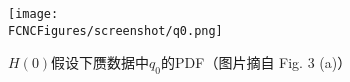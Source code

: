 \begin{figure}[H]
\centering
\texttt{[image: \\FCNCFigures/screenshot/q0.png]}
\caption{$H(0)$假设下赝数据中$q_0$的PDF（图片摘自\cite{CCGV} Fig. 3 (a)）}
\label{fig:q0}
\end{figure}
